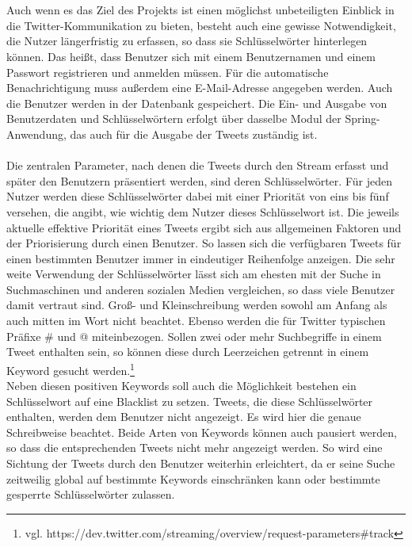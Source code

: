 \\\\ %
Auch wenn es das Ziel des Projekts ist einen möglichst unbeteiligten Einblick in die Twitter-Kommunikation zu bieten, besteht auch eine gewisse Notwendigkeit, die Nutzer längerfristig zu erfassen, so dass sie Schlüsselwörter hinterlegen können. Das heißt, dass Benutzer sich mit einem Benutzernamen und einem Passwort registrieren und anmelden müssen. Für die automatische Benachrichtigung muss außerdem eine E-Mail-Adresse angegeben werden. Auch die Benutzer werden in der Datenbank gespeichert. Die Ein- und Ausgabe von Benutzerdaten und Schlüsselwörtern erfolgt über dasselbe Modul der Spring-Anwendung, das auch für die Ausgabe der Tweets zuständig ist.
\\\\
Die zentralen Parameter, nach denen die Tweets durch den Stream erfasst und später den Benutzern präsentiert werden, sind deren Schlüsselwörter. Für jeden Nutzer werden diese Schlüsselwörter dabei mit einer Priorität von eins bis fünf versehen, die angibt, wie wichtig dem Nutzer dieses Schlüsselwort ist. Die jeweils aktuelle effektive Priorität eines Tweets ergibt sich aus allgemeinen Faktoren und der Priorisierung durch einen Benutzer. So lassen sich die verfügbaren Tweets für einen bestimmten Benutzer immer in eindeutiger Reihenfolge anzeigen. Die sehr weite Verwendung der Schlüsselwörter lässt sich am ehesten mit der Suche in Suchmaschinen und anderen sozialen Medien vergleichen, so dass viele Benutzer damit vertraut sind. Groß- und Kleinschreibung werden sowohl am Anfang als auch mitten im Wort nicht beachtet. Ebenso werden die für Twitter typischen Präfixe \glqq \#\grqq{} und \glqq @\grqq{} miteinbezogen. Sollen zwei oder mehr Suchbegriffe in einem Tweet enthalten sein, so können diese durch Leerzeichen getrennt in einem Keyword gesucht werden.\footnote{vgl. https://dev.twitter.com/streaming/overview/request-parameters\#track} \\
Neben diesen positiven Keywords soll auch die Möglichkeit bestehen ein Schlüsselwort auf eine Blacklist zu setzen. Tweets, die diese Schlüsselwörter enthalten, werden dem Benutzer nicht angezeigt. Es wird hier die genaue Schreibweise beachtet. Beide Arten von Keywords können auch pausiert werden, so dass die entsprechenden Tweets nicht mehr angezeigt werden. So wird eine Sichtung der Tweets durch den Benutzer weiterhin erleichtert, da er seine Suche zeitweilig global auf bestimmte Keywords einschränken kann oder bestimmte gesperrte Schlüsselwörter zulassen. \\
